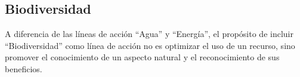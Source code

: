 
\subsection{Biodiversidad}

A diferencia de las líneas de acción ``Agua'' y ``Energía'', el propósito de incluir ``Biodiversidad'' como línea de acción no es optimizar el uso de un recurso, sino promover el conocimiento de un aspecto natural y el reconocimiento de sus beneficios. \\

